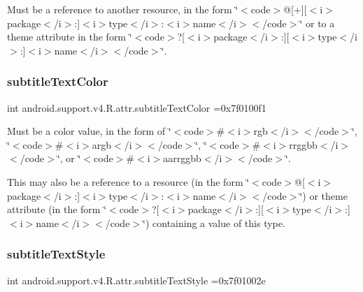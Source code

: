 Must be a reference to another resource, in the form \char`\"{}$<$code$>$@\mbox{[}+\mbox{]}\mbox{[}$<$i$>$package$<$/i$>$\+:\mbox{]}$<$i$>$type$<$/i$>$\+:$<$i$>$name$<$/i$>$$<$/code$>$\char`\"{} or to a theme attribute in the form \char`\"{}$<$code$>$?\mbox{[}$<$i$>$package$<$/i$>$\+:\mbox{]}\mbox{[}$<$i$>$type$<$/i$>$\+:\mbox{]}$<$i$>$name$<$/i$>$$<$/code$>$\char`\"{}. \mbox{\label{classandroid_1_1support_1_1v4_1_1R_1_1attr_a3a89f0ff3e533851db757c20a54dae88}} 
\subsubsection{\texorpdfstring{subtitle\+Text\+Color}{subtitleTextColor}}
{\footnotesize\ttfamily int android.\+support.\+v4.\+R.\+attr.\+subtitle\+Text\+Color =0x7f0100f1\hspace{0.3cm}{\ttfamily [static]}}

Must be a color value, in the form of \char`\"{}$<$code$>$\#$<$i$>$rgb$<$/i$>$$<$/code$>$\char`\"{}, \char`\"{}$<$code$>$\#$<$i$>$argb$<$/i$>$$<$/code$>$\char`\"{}, \char`\"{}$<$code$>$\#$<$i$>$rrggbb$<$/i$>$$<$/code$>$\char`\"{}, or \char`\"{}$<$code$>$\#$<$i$>$aarrggbb$<$/i$>$$<$/code$>$\char`\"{}. 

This may also be a reference to a resource (in the form \char`\"{}$<$code$>$@\mbox{[}$<$i$>$package$<$/i$>$\+:\mbox{]}$<$i$>$type$<$/i$>$\+:$<$i$>$name$<$/i$>$$<$/code$>$\char`\"{}) or theme attribute (in the form \char`\"{}$<$code$>$?\mbox{[}$<$i$>$package$<$/i$>$\+:\mbox{]}\mbox{[}$<$i$>$type$<$/i$>$\+:\mbox{]}$<$i$>$name$<$/i$>$$<$/code$>$\char`\"{}) containing a value of this type. \mbox{\label{classandroid_1_1support_1_1v4_1_1R_1_1attr_a13ed407cca47c2a56528aa612128ea4c}} 
\subsubsection{\texorpdfstring{subtitle\+Text\+Style}{subtitleTextStyle}}
{\footnotesize\ttfamily int android.\+support.\+v4.\+R.\+attr.\+subtitle\+Text\+Style =0x7f01002e\hspace{0.3cm}{\ttfamily [static]}}

